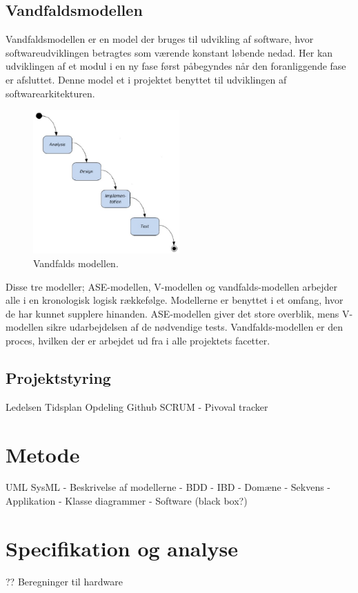 \subsection{Vandfaldsmodellen}
Vandfaldsmodellen er en model der bruges til udvikling af software, hvor softwareudviklingen betragtes som værende konstant løbende nedad. Her kan udviklingen af et modul i en ny fase først påbegyndes når den foranliggende fase er afsluttet. Denne model et i projektet benyttet til udviklingen af softwarearkitekturen. 
\begin{figure}[H]
\includegraphics[width =0.5\textwidth , center]{billeder/Vandfald}
\caption{Vandfalds modellen.}
\end{figure} 
Disse tre modeller; ASE-modellen, V-modellen og vandfalds-modellen arbejder alle i en kronologisk logisk rækkefølge. Modellerne er benyttet i et omfang, hvor de har kunnet supplere hinanden. ASE-modellen giver det store overblik, mens V-modellen sikre udarbejdelsen af de nødvendige tests. Vandfalds-modellen er den proces, hvilken der er arbejdet ud fra i alle projektets facetter.   
\subsection{Projektstyring}
Ledelsen
Tidsplan
Opdeling
Github
SCRUM
- Pivoval tracker
\section{Metode}
UML
SysML
- Beskrivelse af modellerne
	- BDD
	- IBD
	- Domæne
	- Sekvens
	- Applikation
	- Klasse diagrammer
	- Software (black box?)
	
	
	
	\section{Specifikation og analyse}
	??
	Beregninger til hardware

